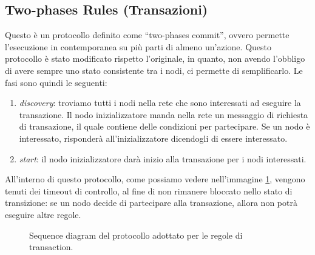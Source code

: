 \documentclass[italian]{memoir}
\begin{document}
\subsection{Two-phases Rules (Transazioni)}
Questo è un protocollo definito come ``two-phases commit'', ovvero permette l'esecuzione in
contemporanea su più parti di almeno un'azione. Questo protocollo è stato modificato rispetto
l'originale, in quanto, non avendo l'obbligo di avere sempre uno stato consistente tra i nodi,
ci permette di semplificarlo. Le fasi sono quindi le seguenti:
\begin{enumerate}
    \item \textit{discovery}: troviamo tutti i nodi nella rete che sono interessati ad eseguire la
    transazione. Il nodo inizializzatore manda nella rete un messaggio di richiesta di transazione,
    il quale contiene delle condizioni per partecipare. Se un nodo è interessato, risponderà all'inizializzatore
    dicendogli di essere interessato.
    \item \textit{start}: il nodo inizializzatore darà inizio alla transazione per i nodi interessati.
\end{enumerate}
All'interno di questo protocollo, come possiamo vedere nell'immagine \ref{img:transazioni}, vengono tenuti dei timeout
di controllo, al fine di non rimanere bloccato nello stato di transizione: se un nodo decide di partecipare 
alla transazione, allora non potrà eseguire altre regole.

\begin{figure}[H]
\caption{Sequence diagram del protocollo adottato per le regole di transaction.}
\label{img:transazioni}
\end{figure}
\end{document}
